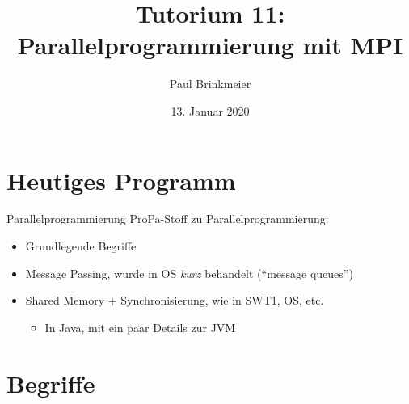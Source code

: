 \documentclass{beamer}
\title{Tutorium 11: Parallelprogrammierung mit MPI}
\author{Paul Brinkmeier}
\institute{Tutorium Programmierparadigmen am KIT}
\date{13. Januar 2020}
\begin{document}
\begin{frame}
	\titlepage
\end{frame}

{
	\begin{frame}[plain]
	\end{frame}
}

\section{Heutiges Programm}

\begin{frame}{Parallelprogrammierung}
	ProPa-Stoff zu Parallelprogrammierung:

	\begin{itemize}
		\item Grundlegende Begriffe
		\item Message Passing, wurde in OS \emph{kurz} behandelt (\enquote{message queues})
		\item Shared Memory + Synchronisierung, wie in SWT1, OS, etc.
		\begin{itemize}
			\item In Java, mit ein paar Details zur JVM
		\end{itemize}
	\end{itemize}
\end{frame}

\section{Begriffe}
\end{document}

